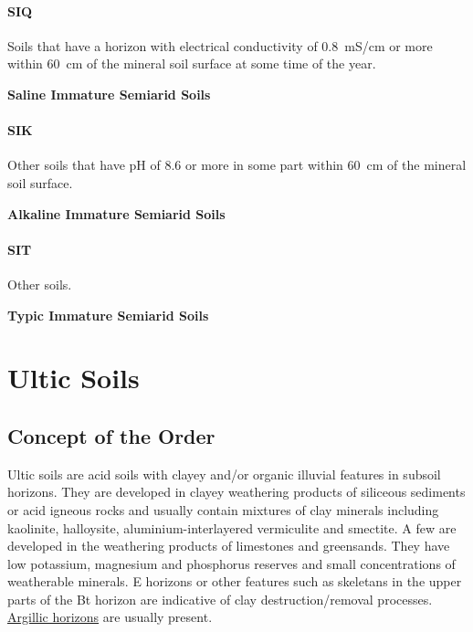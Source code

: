 \documentclass[
  letterpaper,
  DIV=11,
  numbers=noendperiod]{scrreprt}
\begin{document}
\hypertarget{sec-key-SIQ}{%
\subsubsection{\texorpdfstring{\textbf{SIQ}}{SIQ}}\label{sec-key-SIQ}}

Soils that have a horizon with electrical conductivity of 0.8~mS/cm or
more within 60~cm of the mineral soil surface at some time of the year.

\textbf{Saline Immature Semiarid Soils}

\hypertarget{sec-key-SIK}{%
\subsubsection{\texorpdfstring{\textbf{SIK}}{SIK}}\label{sec-key-SIK}}

Other soils that have pH of 8.6 or more in some part within 60~cm of the
mineral soil surface.

\textbf{Alkaline Immature Semiarid Soils}

\hypertarget{sec-key-SIT}{%
\subsubsection{\texorpdfstring{\textbf{SIT}}{SIT}}\label{sec-key-SIT}}

Other soils.

\textbf{Typic Immature Semiarid Soils}


\hypertarget{sec-ord-U}{%
\chapter{Ultic Soils}\label{sec-ord-U}}

\hypertarget{sec-con-U}{%
\section{Concept of the Order}\label{sec-con-U}}

Ultic soils are acid soils with clayey and/or organic illuvial features
in subsoil horizons. They are developed in clayey weathering products of
siliceous sediments or acid igneous rocks and usually contain mixtures
of clay minerals including kaolinite, halloysite, aluminium-interlayered
vermiculite and smectite. A few are developed in the weathering products
of limestones and greensands. They have low potassium, magnesium and
phosphorus reserves and small concentrations of weatherable minerals. E
horizons or other features such as skeletans in the upper parts of the
Bt horizon are indicative of clay destruction/removal processes.
\protect\hyperlink{sec-diag-argh}{Argillic horizons} are usually
present.
\end{document}
